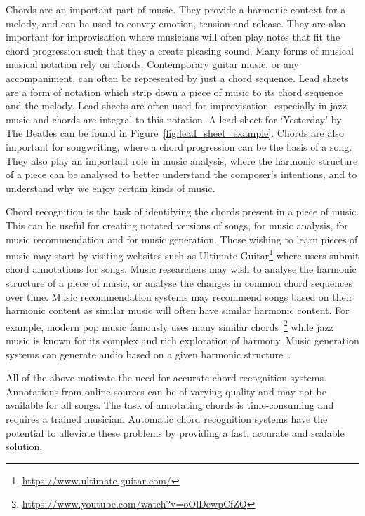 Chords are an important part of music. They provide a harmonic context for a melody, and can be used to convey emotion, tension and release. They are also important for improvisation where musicians will often play notes that fit the chord progression such that they a create pleasing sound. Many forms of musical musical notation rely on chords. Contemporary guitar music, or any accompaniment, can often be represented by just a chord sequence. Lead sheets are a form of notation which strip down a piece of music to its chord sequence and the melody. Lead sheets are often used for improvisation, especially in jazz music and chords are integral to this notation. A lead sheet for `Yesterday' by The Beatles can be found in Figure~\ref{fig:lead_sheet_example}. Chords are also important for songwriting, where a chord progression can be the basis of a song. They also play an important role in music analysis, where the harmonic structure of a piece can be analysed to better understand the composer's intentions, and to understand why we enjoy certain kinds of music.

Chord recognition is the task of identifying the chords present in a piece of music. This can be useful for creating notated versions of songs, for music analysis, for music recommendation and for music generation. Those wishing to learn pieces of music may start by visiting websites such as Ultimate Guitar\footnote{\url{https://www.ultimate-guitar.com/}} where users submit chord annotations for songs. Music researchers may wish to analyse the harmonic structure of a piece of music, or analyse the changes in common chord sequences over time. Music recommendation systems may recommend songs based on their harmonic content as similar music will often have similar harmonic content. For example, modern pop music famously uses many similar chords~\footnote{\url{https://www.youtube.com/watch?v=oOlDewpCfZQ}} while jazz music is known for its complex and rich exploration of harmony. Music generation systems can generate audio based on a given harmonic structure~\citep{MusicGenChord}.

All of the above motivate the need for accurate chord recognition systems. Annotations from online sources can be of varying quality and may not be available for all songs. The task of annotating chords is time-consuming and requires a trained musician. Automatic chord recognition systems have the potential to alleviate these problems by providing a fast, accurate and scalable solution.

